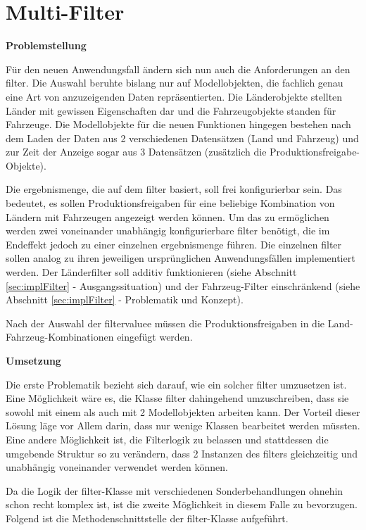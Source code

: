 \section{Multi-Filter} \label{sec:implMulti-Filter}
\textbf{Problemstellung}

Für den neuen Anwendungsfall ändern sich nun auch die Anforderungen an den \gls{filter}. Die Auswahl beruhte bislang nur auf Modellobjekten, die fachlich genau eine Art von anzuzeigenden Daten repräsentierten. Die Länderobjekte stellten Länder mit gewissen Eigenschaften dar und die Fahrzeugobjekte standen für Fahrzeuge. Die Modellobjekte für die neuen Funktionen hingegen bestehen nach dem Laden der Daten aus 2 verschiedenen Datensätzen (Land und Fahrzeug) und zur Zeit der Anzeige sogar aus 3 Datensätzen (zusätzlich die Produktionsfreigabe-Objekte).

Die \gls{ergebnismenge}, die auf dem \gls{filter} basiert, soll frei konfigurierbar sein. Das bedeutet, es sollen Produktionsfreigaben für eine beliebige Kombination von Ländern mit Fahrzeugen angezeigt werden können. Um das zu ermöglichen werden zwei voneinander unabhängig konfigurierbare \gls{filter} benötigt, die im Endeffekt jedoch zu einer einzelnen \gls{ergebnismenge} führen. Die einzelnen \gls{filter} sollen analog zu ihren jeweiligen ursprünglichen Anwendungsfällen implementiert werden. Der Länderfilter soll additiv funktionieren (siehe Abschnitt \ref{sec:implFilter} - Ausgangssituation) und der Fahrzeug-Filter einschränkend (siehe Abschnitt \ref{sec:implFilter} - Problematik und Konzept).

Nach der Auswahl der \gls{filtervalue}e müssen die Produktionsfreigaben in die Land-\-Fahr\-zeug-Kom\-bi\-na\-tio\-nen eingefügt werden.

\textbf{Umsetzung}

Die erste Problematik bezieht sich darauf, wie ein solcher \gls{filter} umzusetzen ist. Eine Möglichkeit wäre es, die Klasse \gls{filter} dahingehend umzuschreiben, dass sie sowohl mit einem als auch mit 2 Modellobjekten arbeiten kann. Der Vorteil dieser Lösung läge vor Allem darin, dass nur wenige Klassen bearbeitet werden müssten.
Eine andere Möglichkeit ist, die Filterlogik zu belassen und stattdessen die umgebende Struktur so zu verändern, dass 2 Instanzen des \gls{filter}s gleichzeitig und unabhängig voneinander verwendet werden können.

Da die Logik der \gls{filter}-Klasse mit verschiedenen Sonderbehandlungen ohnehin schon recht komplex ist, ist die zweite Möglichkeit in diesem Falle zu bevorzugen.
Folgend ist die Methodenschnittstelle der \gls{filter}-Klasse aufgeführt.

